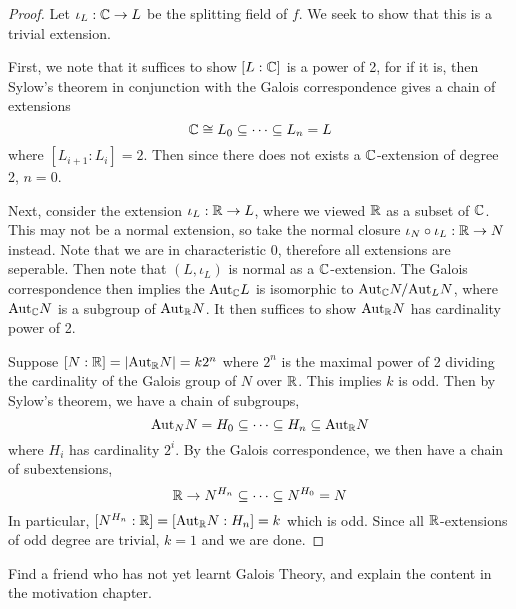 \documentclass[../book.tex]{subfiles}
\begin{document}
\begin{proof}
    
    Let $\iota_L : \mathbb{C} \to L$ be the splitting field of $f$. 
    We seek to show that this is a trivial extension.
    
    First, we note that it suffices to show $[L : \mathbb{C}]$ is a power of 2,
    for if it is, then Sylow's theorem in conjunction with the Galois correspondence
    gives a chain of extensions \[
        \mathbb{C} \cong L_0 \subseteq \cdots \subseteq L_n = L
    \]
    where $[L_{i+1} : L_i] = 2$.
    Then since there does not exists a $\mathbb{C}$-extension of degree 2, $n=0$. 
    
    Next, consider the extension $\iota_L : \mathbb{R} \to L$,
    where we viewed $\mathbb{R}$ as a subset of $\mathbb{C}$. 
    This may not be a normal extension, 
    so take the normal closure $\iota_N \circ \iota_L : \mathbb{R} \to N$ instead.
    Note that we are in characteristic $0$,
    therefore all extensions are seperable. 
    Then note that $(L,\iota_L)$ is normal as a $\mathbb{C}$-extension.
    The Galois correspondence then implies 
    the $\mathrm{Aut}_{\mathbb{C}}L$ is isomorphic to $\mathrm{Aut}_{\mathbb{C}}N / \mathrm{Aut}_{L}N$,
    where $\mathrm{Aut}_{\mathbb{C}}N$ is a subgroup of $\mathrm{Aut}_{\mathbb{R}}N$.
    It then suffices to show $\mathrm{Aut}_{\mathbb{R}}N$ has cardinality power of 2. 
    
    Suppose $[N : \mathbb{R}] = |\mathrm{Aut}_{\mathbb{R}}N| = k 2^n$ where 
    $2^n$ is the maximal power of 2 
    dividing the cardinality of the Galois group of $N$ over $\mathbb{R}$.
    This implies $k$ is odd.
    Then by Sylow's theorem, we have a chain of subgroups, \[
         \mathrm{Aut}_{N}N = H_0 \subseteq \cdots \subseteq H_n \subseteq \mathrm{Aut}_{\mathbb{R}}N
    \]
    where $H_i$ has cardinality $2^i$.
    By the Galois correspondence, we then have a chain of subextensions, \[
        \mathbb{R} \to N^{H_n} \subseteq \cdots \subseteq N^{H_0} = N
    \]
    In particular, $[N^{H_n} : \mathbb{R}] = [\mathrm{Aut}_{\mathbb{R}}N : H_n] = k$ which is odd.
    Since all $\mathbb{R}$-extensions of odd degree are trivial, 
    $k = 1$ and we are done. 
    
\end{proof}

\begin{ex}
    Find a friend who has not yet learnt Galois Theory, 
    and explain the content in the motivation chapter.
\end{ex}
\end{document}
